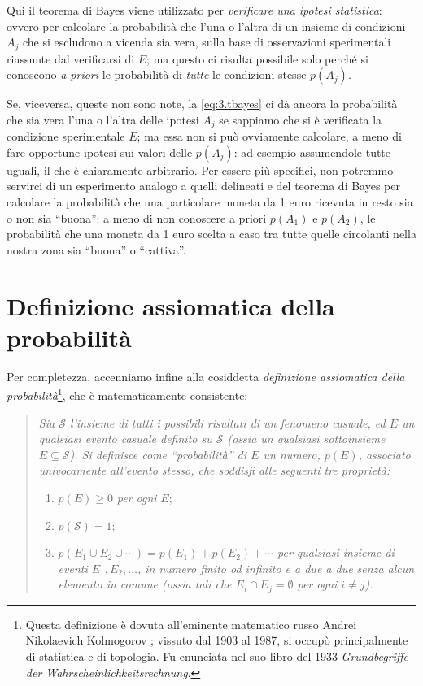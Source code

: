 Qui il teorema di Bayes viene utilizzato per
\emph{verificare una ipotesi statistica}: ovvero per
calcolare la probabilit\`a che l'una o l'altra di un insieme
di condizioni $A_j$ che si escludono a vicenda sia vera,
sulla base di osservazioni sperimentali riassunte dal
verificarsi di $E$; ma questo ci risulta possibile solo
perch\'e si conoscono \emph{a priori} le probabilit\`a di
\emph{tutte} le condizioni stesse $p(A_j)$.

Se, viceversa, queste non sono note, la \eqref{eq:3.tbayes}
ci d\`a ancora la probabilit\`a che sia vera l'una o l'altra
delle ipotesi $A_j$ se sappiamo che si \`e verificata la
condizione sperimentale $E$; ma essa non si pu\`o ovviamente
calcolare, a meno di fare opportune ipotesi sui valori delle
$p(A_j)$: ad esempio assumendole tutte uguali, il che \`e
chiaramente arbitrario.  Per essere pi\`u specifici, non
potremmo servirci di un esperimento analogo a quelli
delineati e del teorema di Bayes per calcolare la
probabilit\`a che una particolare moneta da 1 euro ricevuta
in resto sia o non sia ``buona'': a meno di non conoscere a
priori $p(A_1)$ e $p(A_2)$, le probabilit\`a che una moneta
da 1 euro scelta a caso tra tutte quelle circolanti nella
nostra zona sia ``buona'' o ``cattiva''.%

\section{Definizione assiomatica della probabilit\`a}%
\label{ch:3.deaspr}
Per completezza, accenniamo infine alla cosiddetta
\emph{definizione assiomatica della
  probabilit\`a}\thinspace\footnote{Questa definizione \`e
  dovuta all'eminente matematico russo Andrei Nikolaevich
  Kolmogorov%
  ;
  vissuto dal 1903 al 1987, si occup\`o principalmente di
  statistica e di topologia.  Fu enunciata nel suo libro del
  1933 \textit{Grundbegriffe der
    Wahrscheinlichkeitsrechnung}.}, che \`e matematicamente
consistente:
\begin{quote}
  \textit{Sia $\mathcal{S}$ l'insieme di tutti i possibili
    risultati di un fenomeno casuale, ed $E$ un qualsiasi
    evento casuale definito su $\mathcal{S}$ (ossia un
    qualsiasi sottoinsieme $E \subseteq \mathcal{S}$).  Si
    definisce come ``probabilit\`a'' di $E$ un numero,
    $p(E)$, associato univocamente all'evento stesso, che
    soddisfi alle seguenti tre propriet\`a:}
  \begin{enumerate}
  \item\label{def:3.dap1} $p(E) \ge 0$ \textit{per ogni}
    $E$;
  \item\label{def:3.dap2} $p(\mathcal{S}) = 1$;
  \item\label{def:3.dap3} \itshape $p(E_1 \cup E_2 \cup
    \cdots) = p(E_1) + p(E_2) +\cdots$ per qualsiasi insieme
    di eventi $E_1, E_2,\ldots$, in numero finito od
    infinito e a due a due senza alcun elemento in comune
    (ossia tali che $E_i \cap E_j = \emptyset$ per ogni $i
    \neq j$).
  \end{enumerate}
\end{quote}%

